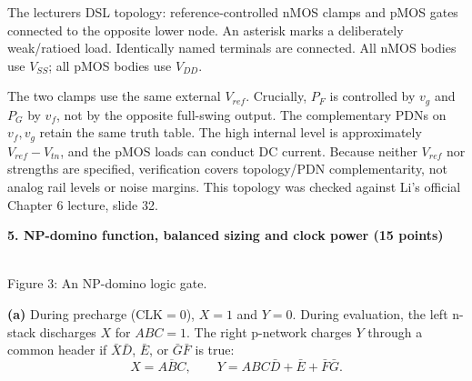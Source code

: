 \documentclass[10pt]{article}
\newcommand{\mos}[4]{\begin{scope}[shift={(#1,#2)}]
\draw (0,.24)--(0,-.24);\draw (0,.20)--(.25,.20)--(.25,.5);
\draw (0,-.20)--(.25,-.20)--(.25,-.5);\draw (-.16,.23)--(-.16,-.23);
\ifnum#4=1\draw (-.26,0) circle (.06);\draw (-.75,0)--(-.32,0);\else\draw (-.75,0)--(-.16,0);\fi
\node[anchor=east,font=\scriptsize] at (-.76,0) {$#3$};\end{scope}}
\newcommand{\ground}[2]{\draw (#1,#2)--(#1,{#2-.12});\draw ({#1-.17},{#2-.12})--({#1+.17},{#2-.12});\draw ({#1-.11},{#2-.20})--({#1+.11},{#2-.20});}
\newcommand{\rail}[3]{\draw (#1,#2)--(#1,{#2+.14});\node[above,font=\scriptsize] at (#1,{#2+.14}) {$#3$};}
\newcommand{\qheading}[1]{\par\medskip\textbf{#1}\par}
\begin{document}
\small The lecturer\textquotesingle s DSL topology: reference-controlled nMOS clamps and pMOS gates connected to the opposite lower node. An asterisk marks a deliberately weak/ratioed load. Identically named terminals are connected. All nMOS bodies use $V_{SS}$; all pMOS bodies use $V_{DD}$.\normalsize\par
The two clamps use the same external $V_{ref}$. Crucially, $P_F$ is controlled by $v_g$ and $P_G$ by $v_f$, not by the opposite full-swing output. The complementary PDNs on $v_f,v_g$ retain the same truth table. The high internal level is approximately $V_{ref}-V_{tn}$, and the pMOS loads can conduct DC current. Because neither $V_{ref}$ nor strengths are specified, verification covers topology/PDN complementarity, not analog rail levels or noise margins. This topology was checked against Li's official Chapter 6 lecture, slide 32.
\newpage
\qheading{5. NP-domino function, balanced sizing and clock power (15 points)}
\begin{center}\\\small Figure 3: An NP-domino logic gate.\end{center}
\textbf{(a)} During precharge ($\mathrm{CLK}=0$), $X=1$ and $Y=0$. During evaluation, the left n-stack discharges $X$ for $ABC=1$. The right p-network charges $Y$ through a common header if $\bar X\bar D$, $\bar E$, or $\bar G\bar F$ is true:
\[\boxed{X=\overline{ABC},\qquad Y=ABC\bar D+\bar E+\bar F\bar G.}\]
\end{document}

